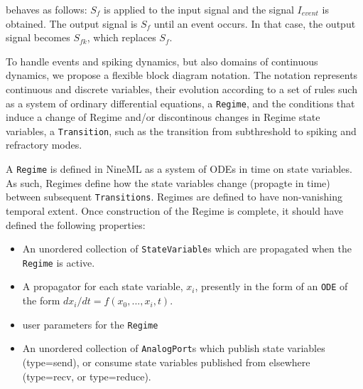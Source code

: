 \documentclass[a4paper]{article}
\newcommand\nmlClass[1]{{\tt #1}}
\begin{document}
behaves as follows: $S_{f}$ is applied to the input signal and the
signal $I_{event}$ is obtained. The output signal is $S_{f}$ until an
event occurs. In that case, the output signal becomes $S_{fk}$, which
replaces $S_{f}$.

To handle events and spiking dynamics, but also domains of continuous
dynamics, we propose a flexible block diagram notation.  The notation
represents continuous and discrete variables, their evolution
according to a set of rules such as a system of ordinary differential
equations, a \nmlClass{Regime}, and the conditions that induce a change of
Regime and/or discontinous changes in Regime state variables, a
\nmlClass{Transition}, such as the transition from subthreshold to
spiking and refractory modes.


A \nmlClass{Regime} is defined in NineML as a system of ODEs in time on
state variables.  As such, Regimes define how the state variables
change (propagte in time) between subsequent \nmlClass{Transitions}.
Regimes are defined to have non-vanishing temporal extent.  Once
construction of the Regime is complete, it should have defined the
following properties:
\begin{itemize}
\item An unordered collection of \nmlClass{StateVariable}s which are propagated when the \nmlClass{Regime} is active.
\item A propagator for each state variable, $x_i$, presently in the
  form of an \nmlClass{ODE} of the form $dx_i/dt = f(x_0, ..., x_i, t)$.
\item user parameters for the \nmlClass{Regime}
\item An unordered collection of \nmlClass{AnalogPort}s which publish state variables (type=send),
  or consume state variables published from elsewhere (type=recv, or type=reduce).
\end{itemize}
\end{document}
